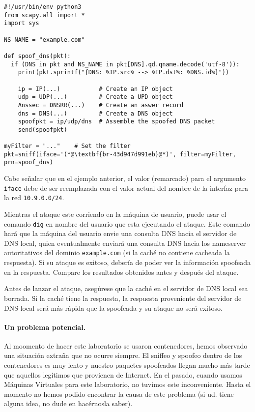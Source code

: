 \begin{lstlisting}
#!/usr/bin/env python3
from scapy.all import *
import sys

NS_NAME = "example.com"

def spoof_dns(pkt):
  if (DNS in pkt and NS_NAME in pkt[DNS].qd.qname.decode('utf-8')):
    print(pkt.sprintf("{DNS: %IP.src% --> %IP.dst%: %DNS.id%}"))

    ip = IP(...)           # Create an IP object
    udp = UDP(...)         # Create a UPD object
    Anssec = DNSRR(...)    # Create an aswer record
    dns = DNS(...)         # Create a DNS object
    spoofpkt = ip/udp/dns  # Assemble the spoofed DNS packet
    send(spoofpkt)

myFilter = "..."    # Set the filter
pkt=sniff(iface='(*@\textbf{br-43d947d991eb}@*)', filter=myFilter, prn=spoof_dns)
\end{lstlisting}

Cabe señalar que en el ejemplo anterior, el valor (remarcado) para el argumento \texttt{iface} debe de ser reemplazada con el valor actual del nombre de la interfaz para la red \texttt{10.9.0.0/24}.

Mientras el ataque este corriendo en la máquina de usuario, puede usar el comando \texttt{dig} en nombre del usuario que esta ejecutando el ataque.
Este comando hará que la máquina del usuario envie una consulta DNS hacia el servidor de DNS local, quien eventualmente enviará una consulta DNS hacia los nameserver autoritativos del dominio \texttt{example.com} (si la caché no contiene cacheada la respuesta).
Si su ataque es exitoso, debería de poder ver la información spoofeada en la respuesta. Compare los resultados obtenidos antes y después del ataque.
 
Antes de lanzar el ataque, asegúrese que la caché en el servidor de DNS local sea borrada. Si la caché tiene la respuesta, la respuesta proveniente del servidor de DNS local será más rápida que la spoofeada y su ataque no será exitoso.


\paragraph{Un problema potencial.} Al moomento de hacer este laboratorio se usaron contenedores, hemos observado una situación extraña que no ocurre siempre. El sniffeo y spoofeo dentro de los contenedores es muy lento y nuestro paquetes spoofeados llegan mucho más tarde que aquellos legítimos que provienen de Internet. En el pasado, cuando usamos Máquinas Virtuales para este laboratorio, no tuvimos este inconveniente. Hasta el momento no hemos podido encontrar la causa de este problema (si ud. tiene alguna idea, no dude en hacérnosla saber).

